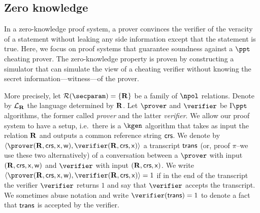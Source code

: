 \let\accentvec\vec \documentclass[runningheads,10pt]{llncs}
\begin{document}
\subsection{Zero knowledge}
In a zero-knowledge proof system, a prover convinces the verifier of
the veracity of a statement without leaking any side information except that the
statement is true.
Here, we focus on proof systems that guarantee soundness against a $\ppt$
cheating prover.
The zero-knowledge property is proven by constructing a simulator that can
simulate the view of a cheating verifier without knowing the secret
information---witness---of the prover.

More precisely, let $\RELGEN(\secparam) = \smallset{\REL}$ be a family of
$\npol$ relations.
Denote by $\mathcal{L}_{\mathbf{R}}$ the language determined by $\mathbf{R}$.
Let $\prover$ and $\verifier$ be I$\ppt$ algorithms, the former called \emph{prover}
and the latter \emph{verifier}. We allow our proof system to have a setup,
i.e.~there is a $\kgen$ algorithm that takes as input the relation $\mathbf{R}$ and
outputs a common reference string $\mathsf{crs}$.
We denote by $\ip{\prover(\REL, \crs, \inp, \wit)}{\verifier(\REL,
\crs,\inp)}$ a transcript $\mathsf{trans}$ (or, proof $\pi$--we use these two
alternatively) of a conversation between a $\prover$ with input
$(\mathbf{R}, \mathsf{crs}, \mathsf{x}, \mathsf{w})$ and $\verifier$ with input $(\mathbf{R}, \mathsf{crs}, \mathsf{x})$.
We write $\ip{\prover (\REL, \crs, \inp, \wit)}{\verifier(\REL, \crs, \inp)} =
1$ if in the end of the transcript the verifier $\verifier$ returns $1$ and
say that $\verifier$ accepts the transcript. We sometimes abuse notation and
write $\verifier(\trans) = 1$ to denote a fact that $\mathsf{trans}$ is accepted by
the verifier. 
\end{document}
